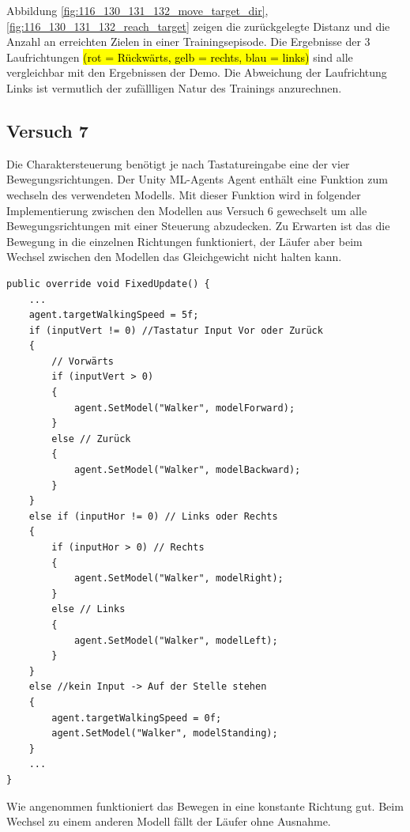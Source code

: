 Abbildung \ref{fig:116_130_131_132_move_target_dir}, \ref{fig:116_130_131_132_reach_target} zeigen die zurückgelegte Distanz und die Anzahl an erreichten Zielen in einer Trainingsepisode. Die Ergebnisse der 3 Laufrichtungen \hl{(rot = Rückwärts, gelb = rechts, blau = links)} sind alle vergleichbar mit den Ergebnissen der Demo. Die Abweichung der Laufrichtung Links ist vermutlich der zufällligen Natur des Trainings anzurechnen.

\subsection{Versuch 7}
Die Charaktersteuerung benötigt je nach Tastatureingabe eine der vier Bewegungsrichtungen. Der Unity ML-Agents Agent enthält eine Funktion zum wechseln des verwendeten Modells. Mit dieser Funktion wird in folgender Implementierung zwischen den Modellen aus Versuch 6 gewechselt um alle Bewegungsrichtungen mit einer Steuerung abzudecken. Zu Erwarten ist das die Bewegung in die einzelnen Richtungen funktioniert, der Läufer aber beim Wechsel zwischen den Modellen das Gleichgewicht nicht halten kann.

\begin{lstlisting}[caption={Laufrichtung Modell wechseln},captionpos=b,label={lst:laufrichtung_modell_wechsel}]
public override void FixedUpdate() {
    ...    
    agent.targetWalkingSpeed = 5f;
    if (inputVert != 0) //Tastatur Input Vor oder Zurück
    {
        // Vorwärts
        if (inputVert > 0)
        {
            agent.SetModel("Walker", modelForward);
        }
        else // Zurück
        {
            agent.SetModel("Walker", modelBackward);
        }
    }
    else if (inputHor != 0) // Links oder Rechts
    {
        if (inputHor > 0) // Rechts
        {
            agent.SetModel("Walker", modelRight);
        }
        else // Links
        {
            agent.SetModel("Walker", modelLeft);
        }
    }
    else //kein Input -> Auf der Stelle stehen
    {
        agent.targetWalkingSpeed = 0f;
        agent.SetModel("Walker", modelStanding);
    }
    ...
}
\end{lstlisting}

Wie angenommen funktioniert das Bewegen in eine konstante Richtung gut. Beim Wechsel zu einem anderen Modell fällt der Läufer ohne Ausnahme.

